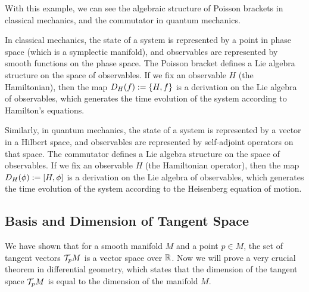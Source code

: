 With this example, we can see the algebraic structure of Poisson brackets in classical mechanics, and the commutator in quantum mechanics.
\begin{remark}
    In classical mechanics, the state of a system is represented by a point in phase space (which is a symplectic manifold), and observables are represented by smooth functions on the phase space. The Poisson bracket defines a Lie algebra structure on the space of observables. If we fix an observable \(H\) (the Hamiltonian), then the map \(D_H(f) := \acomm{H}{f}\) is a derivation on the Lie algebra of observables, which generates the time evolution of the system according to Hamilton's equations.
\end{remark}
\begin{remark}
    Similarly, in quantum mechanics, the state of a system is represented by a vector in a Hilbert space, and observables are represented by self-adjoint operators on that space. The commutator defines a Lie algebra structure on the space of observables. If we fix an observable \(H\) (the Hamiltonian operator), then the map \(D_H(\phi) := \comm{H}{\phi}\) is a derivation on the Lie algebra of observables, which generates the time evolution of the system according to the Heisenberg equation of motion.
\end{remark}

\subsection{Basis and Dimension of Tangent Space}

We have shown that for a smooth manifold \(M\) and a point \(p \in M\), the set of tangent vectors \(\mathcal T_p M\) is a vector space over \(\mathbb R\). Now we will prove a very crucial theorem in differential geometry, which states that the dimension of the tangent space \(\mathcal T_p M\) is equal to the dimension of the manifold \(M\).

